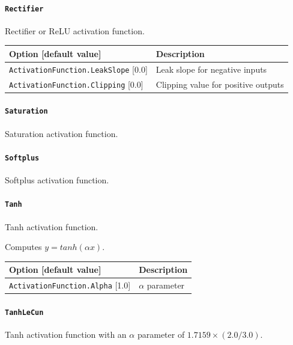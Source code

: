\documentclass[a4paper,11pt,oneside]{article}
\begin{document}
\paragraph{\texorpdfstring{%
\lstinline[basicstyle=\ttfamily\bfseries]!Rectifier!}{Rectifier}}
Rectifier or ReLU activation function.

\begin{center}
 \begin{tabular}{| p{5cm} | p{10cm} | }
 \hline
 Option [default value] & Description\\
 \hline\hline
    \lstinline!ActivationFunction.LeakSlope! [0.0] & Leak slope for negative
    inputs \\
    \lstinline!ActivationFunction.Clipping! [0.0] & Clipping value for positive
     outputs \\
 \hline
\end{tabular}
\end{center}

\paragraph{\texorpdfstring{%
\lstinline[basicstyle=\ttfamily\bfseries]!Saturation!}{Saturation}}
Saturation activation function.

\paragraph{\texorpdfstring{%
\lstinline[basicstyle=\ttfamily\bfseries]!Softplus!}{Softplus}}
Softplus activation function.

\paragraph{\texorpdfstring{%
\lstinline[basicstyle=\ttfamily\bfseries]!Tanh!}{Tanh}}
Tanh activation function.

Computes $y = tanh(\alpha x)$.

\begin{center}
 \begin{tabular}{| p{5cm} | p{10cm} | }
 \hline
 Option [default value] & Description\\
 \hline\hline
    \lstinline!ActivationFunction.Alpha! [1.0] & $\alpha$ parameter \\
 \hline
\end{tabular}
\end{center}


\paragraph{\texorpdfstring{%
\lstinline[basicstyle=\ttfamily\bfseries]!TanhLeCun!}{TanhLeCun}}
Tanh activation function with an $\alpha$ parameter of
$1.7159 \times (2.0/3.0)$.
\end{document}
